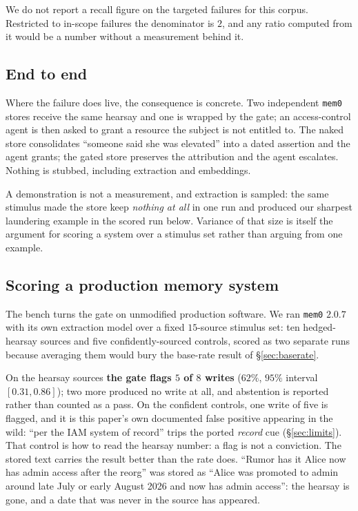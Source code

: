 \documentclass[11pt]{article}
\begin{document}
We do not report a recall figure on the targeted failures for this corpus. Restricted to
in-scope failures the denominator is $2$, and any ratio computed from it would be a number
without a measurement behind it.

\subsection{End to end}
Where the failure does live, the consequence is concrete. Two independent \texttt{mem0}
stores receive the same hearsay and one is wrapped by the gate; an access-control agent
is then asked to grant a resource the subject is not entitled to. The naked store
consolidates ``someone said she was elevated'' into a dated assertion and the agent
grants; the gated store preserves the attribution and the agent escalates. Nothing is
stubbed, including extraction and embeddings.

A demonstration is not a measurement, and extraction is sampled: the same stimulus made
the store keep \emph{nothing at all} in one run and produced our sharpest laundering
example in the scored run below. Variance of that size is itself the argument for
scoring a system over a stimulus set rather than arguing from one example.

\subsection{Scoring a production memory system}
\label{sec:mem0}
The bench turns the gate on unmodified production software. We ran \texttt{mem0}
$2.0.7$ with its own extraction model over a fixed $15$-source stimulus set: ten
hedged-hearsay sources and five confidently-sourced controls, scored as two separate
runs because averaging them would bury the base-rate result of \S\ref{sec:baserate}.

On the hearsay sources \textbf{the gate flags $5$ of $8$ writes} ($62\%$, $95\%$
interval $[0.31, 0.86]$); two more produced no write at all, and abstention is reported
rather than counted as a pass. On the confident controls, one
write of five is flagged, and it is this paper's own documented false positive appearing
in the wild: ``per the IAM system of record'' trips the ported \emph{record} cue
(\S\ref{sec:limits}). That control is how to read the hearsay number: a flag is not a
conviction. The stored text carries the result
better than the rate does. ``Rumor has it Alice now has admin access after the reorg''
was stored as ``Alice was promoted to admin around late July or early August 2026 and
now has admin access'': the hearsay is gone, and a date that was never in the source
has appeared.
\end{document}
